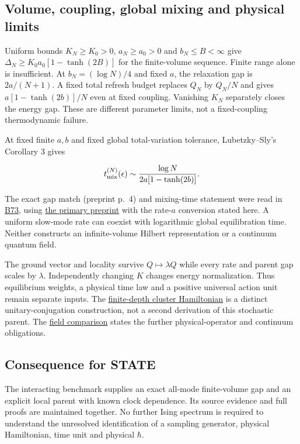 \documentclass[11pt,a4paper]{article}
\begin{document}
\hypertarget{volume-coupling-global-mixing-and-physical-limits}{%
\subsection{Volume, coupling, global mixing and physical
limits}\label{volume-coupling-global-mixing-and-physical-limits}}

Uniform bounds \(K_N\ge K_0>0\), \(a_N\ge a_0>0\) and
\(b_N\le B<\infty\) give \(\Delta_N\ge K_0a_0[1-\tanh(2B)]\) for the
finite-volume sequence. Finite range alone is insufficient. At
\(b_N=(\log N)/4\) and fixed \(a\), the relaxation gap is \(2a/(N+1)\).
A fixed total refresh budget replaces \(Q_N\) by \(Q_N/N\) and gives
\(a[1-\tanh(2b)]/N\) even at fixed coupling. Vanishing \(K_N\)
separately closes the energy gap. These are different parameter limits,
not a fixed-coupling thermodynamic failure.

At fixed finite \(a,b\) and fixed global total-variation tolerance,
Lubetzky--Sly's Corollary 3 gives

\[t_{\rm mix}^{(N)}(\epsilon)\sim\frac{\log N}{2a[1-\tanh(2b)]}.\]

The exact gap match (preprint p.~4) and mixing-time statement were read
in \href{../references/batches/B73.md}{B73}, using
\href{https://arxiv.org/pdf/0909.4320v1}{the primary preprint} with the
rate-\(a\) conversion stated here. A uniform slow-mode rate can coexist
with logarithmic global equilibration time. Neither constructs an
infinite-volume Hilbert representation or a continuum quantum field.

The ground vector and locality survive \(Q\mapsto\lambda Q\) while every
rate and parent gap scales by \(\lambda\). Independently changing \(K\)
changes energy normalization. Thus equilibrium weights, a physical time
law and a positive universal action unit remain separate inputs. The
\href{finite-depth-spin-gap.md}{finite-depth cluster Hamiltonian} is a
distinct unitary-conjugation construction, not a second derivation of
this stochastic parent. The \href{comparison-and-bridges.md}{field
comparison} states the further physical-operator and continuum
obligations.

\hypertarget{consequence-for-state}{%
\subsection{Consequence for STATE}\label{consequence-for-state}}

The interacting benchmark supplies an exact all-mode finite-volume gap
and an explicit local parent with known clock dependence. Its source
evidence and full proofs are maintained together. No further Ising
spectrum is required to understand the unresolved identification of a
sampling generator, physical Hamiltonian, time unit and physical
\(\hbar\).
\end{document}
